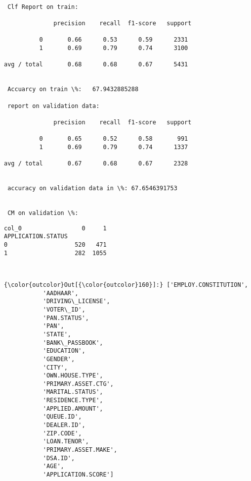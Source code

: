 \documentclass[11pt]{article}
\begin{document}
    \begin{Verbatim}[commandchars=\\\{\}]

 Clf Report on train: 

              precision    recall  f1-score   support

          0       0.66      0.53      0.59      2331
          1       0.69      0.79      0.74      3100

avg / total       0.68      0.68      0.67      5431


 Accuarcy on train \%:   67.9432885288

 report on validation data: 

              precision    recall  f1-score   support

          0       0.65      0.52      0.58       991
          1       0.69      0.79      0.74      1337

avg / total       0.67      0.68      0.67      2328


 accuracy on validation data in \%: 67.6546391753


 CM on validation \%: 

    \end{Verbatim}

    
    \begin{verbatim}
col_0                 0     1
APPLICATION.STATUS           
0                   520   471
1                   282  1055
    \end{verbatim}

    
    \begin{center}
    \end{center}
    { \hspace*{\fill} \\}
    
\begin{Verbatim}[commandchars=\\\{\}]
{\color{outcolor}Out[{\color{outcolor}160}]:} ['EMPLOY.CONSTITUTION',
           'AADHAAR',
           'DRIVING\_LICENSE',
           'VOTER\_ID',
           'PAN.STATUS',
           'PAN',
           'STATE',
           'BANK\_PASSBOOK',
           'EDUCATION',
           'GENDER',
           'CITY',
           'OWN.HOUSE.TYPE',
           'PRIMARY.ASSET.CTG',
           'MARITAL.STATUS',
           'RESIDENCE.TYPE',
           'APPLIED.AMOUNT',
           'QUEUE.ID',
           'DEALER.ID',
           'ZIP.CODE',
           'LOAN.TENOR',
           'PRIMARY.ASSET.MAKE',
           'DSA.ID',
           'AGE',
           'APPLICATION.SCORE']
\end{Verbatim}
            
\end{document}
